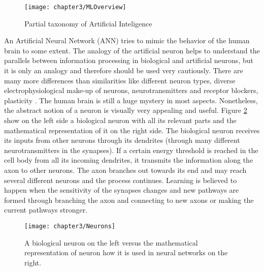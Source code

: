 \begin{figure}[H]
  \centering
  \caption{Partial taxonomy of Artificial Inteligence \cite{alom2018history}}
  \texttt{[image: chapter3/MLOverview]}
  \label{fig:MLOverview}
\end{figure}

An Artificial Neural Network (ANN) tries to mimic the behavior of the human brain to some extent. The analogy of the artificial neuron helps to understand the parallels between information processing in biological and artificial neurons, but it is only an analogy and therefore should be used very cautiously. There are many more differences than similarities like different neuron types, diverse electrophysiological make-up of neurons, neurotransmitters and receptor blockers, plasticity \cite{brunel2014single, london2005dendritic}. The human brain is still a huge mystery in most aspects. Nonetheless, the abstract notion of a neuron is visually very appealing and useful. Figure \ref{fig:Neurons} show on the left side a biological neuron with all its relevant parts and the mathematical representation of it on the right side. The biological neuron receives its inputs from other neurons through its dendrites (through many different neurotransmitters in the synapses). If a certain energy threshold is reached in the cell body from all its incoming dendrites, it transmits the information along the axon to other neurons. The axon branches out towards its end and may reach several different neurons and the process continues. Learning is believed to happen when the sensitivity of the synapses changes and new pathways are formed through branching the axon and connecting to new axons or making the current pathways stronger.

\begin{figure}[H]
  \centering
  \caption{A biological neuron on the left versus the mathematical representation of neuron how it is used in neural networks on the right. \cite{cs231neuralnetworks}}
  \texttt{[image: chapter3/Neurons]}
  \label{fig:Neurons}
\end{figure}

